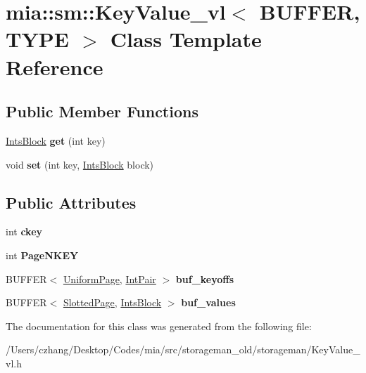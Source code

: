 \hypertarget{classmia_1_1sm_1_1_key_value__vl}{\section{mia\-:\-:sm\-:\-:Key\-Value\-\_\-vl$<$ B\-U\-F\-F\-E\-R, T\-Y\-P\-E $>$ Class Template Reference}
\label{classmia_1_1sm_1_1_key_value__vl}
}
\subsection*{Public Member Functions}
\begin{DoxyCompactItemize}
\item 
\hypertarget{classmia_1_1sm_1_1_key_value__vl_a9665521d6b2bb32aca967ee9784052b6}{\hyperlink{classmia_1_1sm_1_1_ints_block}{Ints\-Block} {\bfseries get} (int key)}\label{classmia_1_1sm_1_1_key_value__vl_a9665521d6b2bb32aca967ee9784052b6}

\item 
\hypertarget{classmia_1_1sm_1_1_key_value__vl_a460a87329112fca6b893c7167d1320e9}{void {\bfseries set} (int key, \hyperlink{classmia_1_1sm_1_1_ints_block}{Ints\-Block} block)}\label{classmia_1_1sm_1_1_key_value__vl_a460a87329112fca6b893c7167d1320e9}

\end{DoxyCompactItemize}
\subsection*{Public Attributes}
\begin{DoxyCompactItemize}
\item 
\hypertarget{classmia_1_1sm_1_1_key_value__vl_ad303ff8a508197039fed3ef8fd4ce0b7}{int {\bfseries ckey}}\label{classmia_1_1sm_1_1_key_value__vl_ad303ff8a508197039fed3ef8fd4ce0b7}

\item 
\hypertarget{classmia_1_1sm_1_1_key_value__vl_a9c7d8b261317031477d6153cc8d26afc}{int {\bfseries Page\-N\-K\-E\-Y}}\label{classmia_1_1sm_1_1_key_value__vl_a9c7d8b261317031477d6153cc8d26afc}

\item 
\hypertarget{classmia_1_1sm_1_1_key_value__vl_a8eb8938e346bf18cc128cf894e5fbc05}{B\-U\-F\-F\-E\-R$<$ \hyperlink{classmia_1_1sm_1_1_uniform_page}{Uniform\-Page}, \hyperlink{classmia_1_1sm_1_1_int_pair}{Int\-Pair} $>$ {\bfseries buf\-\_\-keyoffs}}\label{classmia_1_1sm_1_1_key_value__vl_a8eb8938e346bf18cc128cf894e5fbc05}

\item 
\hypertarget{classmia_1_1sm_1_1_key_value__vl_a35620180baa6b260035f0b35f11ea319}{B\-U\-F\-F\-E\-R$<$ \hyperlink{classmia_1_1sm_1_1_slotted_page}{Slotted\-Page}, \hyperlink{classmia_1_1sm_1_1_ints_block}{Ints\-Block} $>$ {\bfseries buf\-\_\-values}}\label{classmia_1_1sm_1_1_key_value__vl_a35620180baa6b260035f0b35f11ea319}

\end{DoxyCompactItemize}


The documentation for this class was generated from the following file\-:\begin{DoxyCompactItemize}
\item 
/\-Users/czhang/\-Desktop/\-Codes/mia/src/storageman\-\_\-old/storageman/Key\-Value\-\_\-vl.\-h\end{DoxyCompactItemize}
